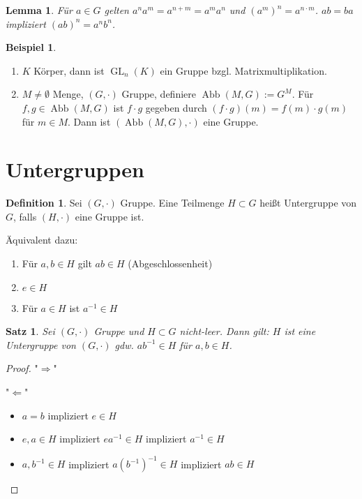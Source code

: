 \documentclass[12pt]{scrartcl}%
\newtheorem{thm}{Satz}
\newtheorem{lemma}{Lemma}
\theoremstyle{definition}
\newtheorem*{defn}{Definition}
\newtheorem{ex}{Beispiel}
\theoremstyle{remark}
\DeclareMathOperator{\gl}{GL}
\DeclareMathOperator{\abb}{Abb}
\newcommand{\inv}[1]{\left(#1\right)^{-1}}
\newcommand{\Inv}[1]{#1^{-1}}
\begin{document}
\begin{lemma}
    Für $a\in G$ gelten $a^n a^m=a^{n+m}=a^m a^n$ und $\left(a^m \right)^n = a^{n\cdot m}$.
    $ab=ba$ impliziert $\left(ab \right)^n = a^n b^n$.
\end{lemma}

\begin{ex}
    \begin{enumerate}
        \item $K$ Körper, dann ist $\gl_n(K)$ ein Gruppe bzgl. Matrixmultiplikation.
        \item $M\neq \emptyset$ Menge, $(G, \cdot)$ Gruppe, definiere $\abb(M,G):=G^M$. Für $f,g\in \abb(M,G)$ ist $f\cdot g$ gegeben durch $(f\cdot g)(m)=f(m)\cdot g(m)$ für $m\in M$. Dann ist $(\abb(M,G), \cdot)$ eine Gruppe.
    \end{enumerate}
\end{ex}



\section{Untergruppen}

\begin{defn}
    Sei $(G, \cdot)$ Gruppe. Eine Teilmenge $H\subset G$ heißt Untergruppe von $G$, falls $(H, \cdot)$ eine Gruppe ist.

    Äquivalent dazu:

    \begin{enumerate}[label=(\roman*)]
        \item Für $a,b\in H$ gilt $ab\in H$ (Abgeschlossenheit)
        \item $e\in H$
        \item Für $a\in H$ ist $\Inv a \in H$
    \end{enumerate}
\end{defn}

\begin{thm}
    Sei $(G, \cdot)$ Gruppe und $H\subset G$ nicht-leer. Dann gilt: $H$ ist eine Untergruppe von $(G, \cdot)$ gdw. $a\Inv b\in H$ für $a,b\in H$.
\end{thm}

\begin{proof}
    "$\Rightarrow$" \checkmark

    "$\Leftarrow$" 
    \begin{itemize} 
        \item $a=b$ impliziert $e\in H$
        \item $e,a\in H$ impliziert $e\Inv a\in H$ impliziert $\Inv a \in H$
        \item $a,\Inv b\in H$ impliziert $a\inv{\Inv b} \in H$ impliziert $ab\in H$ \qedhere
    \end{itemize}
\end{proof}
\end{document}
